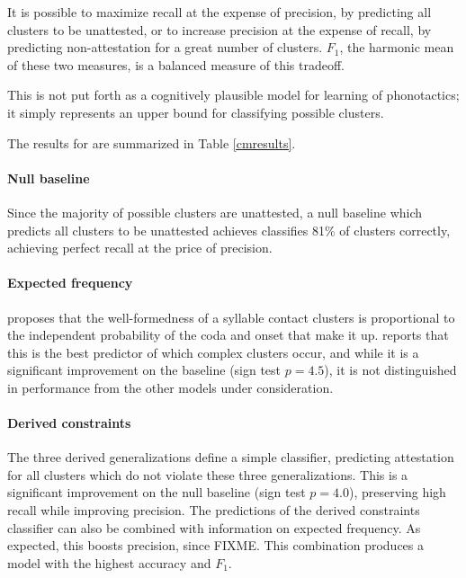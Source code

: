It is possible to maximize recall at the expense of precision, by predicting all clusters to be unattested, or to increase precision at the expense of recall, by predicting non-attestation for a great number of clusters. $F_1$, the harmonic mean of these two measures, is a balanced measure of this tradeoff.

This is not put forth as a cognitively plausible model for learning of phonotactics; it simply represents an upper bound for classifying possible clusters. 

The results for are summarized in Table \ref{cmresults}.

\paragraph{Null baseline} Since the majority of possible clusters are unattested, a null baseline which predicts all clusters to be unattested achieves classifies 81\% of clusters correctly, achieving perfect recall at the price of precision.

\paragraph{Expected frequency} \citet{Pierrehumbert1994} proposes that the well-formedness of a syllable contact clusters is proportional to the independent probability of the coda and onset that make it up. \citeauthor{Pierrehumbert1994} reports that this is the best predictor of which complex clusters occur, and while it is a significant improvement on the baseline (sign test $p = 4.5$), it is not distinguished in performance from the other models under consideration.

\paragraph{Derived constraints} The three derived generalizations define a simple classifier, predicting attestation for all clusters which do not violate these three generalizations. This is a significant improvement on the null baseline (sign test $p = 4.0$), preserving high recall while improving precision. The predictions of the derived constraints classifier can also be combined with information on expected frequency. As expected, this boosts precision, since FIXME. This combination produces a model with the highest accuracy and $F_1$.

